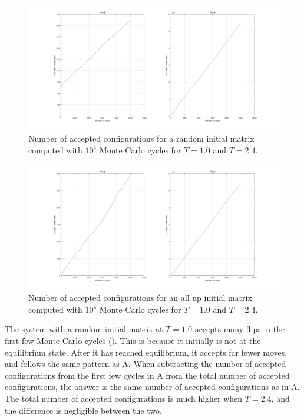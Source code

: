 \documentclass[10pt,a4paper]{article}
\begin{document}
\begin{figure} [H]
\centerline{
\includegraphics[scale=0.245]{randomaccept.jpg}
}
\caption{Number of accepted configurations for a random initial matrix computed with $10^4$ Monte Carlo cycles for $T=1.0$ and $T=2.4$.}
\label{fig:RandomAccept}
\end{figure}

\begin{figure} [H]
\centerline{
\includegraphics[scale=0.245]{upaccept.jpg}
}
\caption{Number of accepted configurations for an all up initial matrix computed with $10^4$ Monte Carlo cycles for $T=1.0$ and $T=2.4$.}
\label{fig:UpAccept}
\end{figure}
\noindent The system with a random initial matrix at $T=1.0$ accepts many flips in the first few Monte Carlo cycles (). This is because it initially is not at the equilibrium state. After it has reached equilibrium, it accepts far fewer moves, and follows the same pattern as  A. When subtracting the number of accepted configurations from the first few cycles in  A from the total number of accepted configurations, the answer is the same number of accepted configurations as in  A. The total number of accepted configurations is much higher when $T=2.4$, and the difference is negligible between the two.
\end{document}

